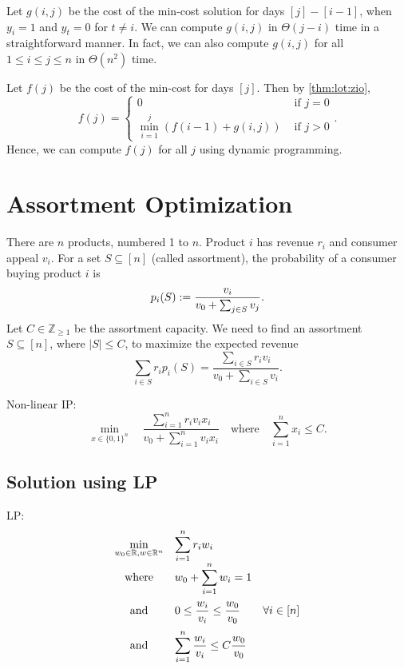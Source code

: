 \documentclass[a4paper,12pt,fleqn]{article}
\newcommand*{\optprog}[3]{
\begin{array}{{>{\displaystyle}c}*2{>{\displaystyle}l}}
#1 & \multicolumn{2}{>{\displaystyle}l}{#2}
#3 \end{array}}
\begin{document}
Let $g(i, j)$ be the cost of the min-cost solution for days $[j] - [i-1]$,
when $y_i = 1$ and $y_t = 0$ for $t \neq i$.
We can compute $g(i, j)$ in $\Theta(j-i)$ time in a straightforward manner.
In fact, we can also compute $g(i, j)$ for all $1 \le i \le j \le n$ in $\Theta(n^2)$ time.

Let $f(j)$ be the cost of the min-cost for days $[j]$. Then by \cref{thm:lot:zio},
\[ f(j) = \begin{cases}
0 & \textrm{ if } j = 0
\\ \displaystyle \min_{i=1}^j (f(i-1) + g(i, j)) & \textrm{ if } j > 0
\end{cases} .\]
Hence, we can compute $f(j)$ for all $j$ using dynamic programming.

\section{Assortment Optimization}

There are $n$ products, numbered 1 to $n$.
Product $i$ has revenue $r_i$ and consumer appeal $v_i$.
For a set $S \subseteq [n]$ (called assortment),
the probability of a consumer buying product $i$ is
\[ p_i(S) := \frac{v_i}{v_0 + \sum_{j \in S} v_j}. \]
Let $C \in \mathbb{Z}_{\ge 1}$ be the assortment capacity.
We need to find an assortment $S \subseteq [n]$, where $|S| \le C$, to maximize the expected revenue
\[ \sum_{i \in S} r_ip_i(S) = \frac{\sum_{i \in S} r_iv_i}{v_0 + \sum_{i \in S} v_i}. \]

Non-linear IP:
\[ \min_{x \in \{0, 1\}^n}\quad\frac{\sum_{i=1}^n r_iv_ix_i}{v_0 + \sum_{i=1}^n v_ix_i}%
\quad\textrm{where}\quad \sum_{i=1}^n x_i \le C. \]

\subsection{Solution using LP}

LP:
\[ \optprog{\min_{w_0 \in \mathbb{R}, w \in \mathbb{R}^n}}{\sum_{i=1}^n r_iw_i}{
\\ \textrm{where} & w_0 + \sum_{i=1}^n w_i = 1
\\[1.5em] \textrm{and} & 0 \le \frac{w_i}{v_i} \le \frac{w_0}{v_0} & \forall i \in [n]
\\[1.1em] \textrm{and} & \sum_{i=1}^n \frac{w_i}{v_i} \le C\frac{w_0}{v_0}
} \]
\end{document}
